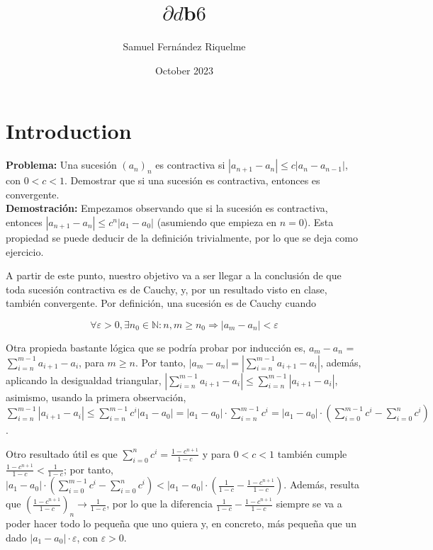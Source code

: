 \documentclass{article}
\title{$\partial d$b$6$}
\author{Samuel Fernández Riquelme}
\date{October 2023}
\begin{document}
\maketitle

\section{Introduction}

\textbf{Problema:} Una sucesión $(a_n)_n$ es contractiva si $|a_{n + 1} - a_n| \leq c|a_n - a_{n - 1}|$, con $0 < c < 1$. Demostrar que si una sucesión es contractiva, entonces es convergente. \\

\textbf{Demostración:} Empezamos observando que si la sucesión es contractiva, entonces $|a_{n + 1} - a_n| \leq c^{n}|a_1 - a_0|$ (asumiendo que empieza en $n = 0$). Esta propiedad se puede deducir de la definición trivialmente, por lo que se deja como ejercicio.

A partir de este punto, nuestro objetivo va a ser llegar a la conclusión de que toda sucesión contractiva es de Cauchy, y, por un resultado visto en clase, también convergente. Por definición, una sucesión es de Cauchy cuando 

\[\forall\varepsilon > 0, \exists n_0 \in \mathbb{N}: n,m \geq n_0 \Longrightarrow |a_m - a_n| < \varepsilon\]

Otra propieda bastante lógica que se podría probar por inducción es, $a_m - a_n$ = $\sum_{i = n}^{m - 1} a_{i + 1} - a_i$, para $m \geq n$. Por tanto, $|a_m - a_n| = |\sum_{i = n}^{m - 1} a_{i + 1} - a_i|$, además, aplicando la desigualdad triangular, $|\sum_{i = n}^{m - 1} a_{i + 1} - a_i| \leq \sum_{i = n}^{m - 1} |a_{i + 1} - a_i|$, asimismo, usando la primera observación, $\sum_{i = n}^{m - 1} |a_{i + 1} - a_i| \leq \sum_{i = n}^{m - 1} c^{i}|a_1 - a_0| = |a_1 - a_0|·\sum_{i = n}^{m - 1} c^{i} = |a_1 - a_0|·(\sum_{i = 0}^{m - 1} c^{i} - \sum_{i = 0}^{n} c^{i})$.

Otro resultado útil es que $\sum_{i = 0}^{n} c^{i} = \frac{1 - c^{n + 1}}{1 - c}$ y para $0 < c < 1$ también cumple $\frac{1 - c^{n + 1}}{1 - c} < \frac{1}{1 - c}$; por tanto, $|a_1 - a_0|·(\sum_{i = 0}^{m - 1} c^{i} - \sum_{i = 0}^{n} c^{i}) < |a_1 - a_0|·(\frac{1}{1 - c} - \frac{1 - c^{n + 1}}{1 - c})$. Además, resulta que $(\frac{1 - c^{n + 1}}{1 - c})_n \longrightarrow \frac{1}{1 - c}$, por lo que la diferencia $\frac{1}{1 - c} - \frac{1 - c^{n + 1}}{1 - c}$ siempre se va a poder hacer todo lo pequeña que uno quiera y, en concreto, más pequeña que un dado $|a_1 - a_0|·\varepsilon$, con $\varepsilon > 0$. 
\end{document}
